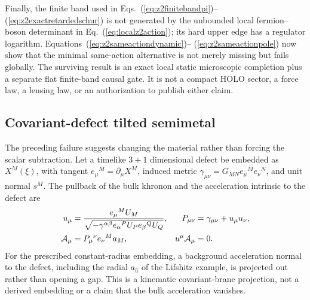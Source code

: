 \documentclass[10pt]{article}
\begin{document}
Finally, the finite band used in Eqs.~(\ref{eq:z2finitebandpi})--
(\ref{eq:z2exactretardedschur}) is not generated by the unbounded local
fermion--boson determinant in Eq.~(\ref{eq:localz2action}); its hard upper edge
has a regulator logarithm.  Equations~(\ref{eq:z2sameactiondynamic})--
(\ref{eq:z2sameactionpole}) now show that the minimal same-action alternative
is not merely missing but fails globally.  The surviving result is an exact
local static microscopic completion plus a separate flat finite-band causal
gate.  It is not a compact HOLO sector, a force law, a lensing law, or an
authorization to publish either claim.

\subsection{Covariant-defect tilted semimetal}
\label{sec:branetiltedsemimetal}

The preceding failure suggests changing the material rather than forcing the
scalar subtraction.  Let a timelike $3+1$ dimensional defect be embedded as
$X^M(\xi)$, with tangent $e_\mu{}^M=\partial_\mu X^M$, induced metric
$\gamma_{\mu\nu}=G_{MN}e_\mu{}^Me_\nu{}^N$, and unit normal $s^M$.  The pullback
of the bulk khronon and the acceleration intrinsic to the defect are
\begin{equation}
 \begin{aligned}
 u_\mu&=\frac{e_\mu{}^MU_M}
 {\sqrt{-\gamma^{\alpha\beta}e_\alpha{}^PU_Pe_\beta{}^QU_Q}},
 &P_{\mu\nu}&=\gamma_{\mu\nu}+u_\mu u_\nu,\\
 {\cal A}_\mu&=P_\mu{}^\nu e_\nu{}^Ma_M,
 &u^\mu{\cal A}_\mu&=0 .
 \end{aligned}
 \label{eq:defectacceleration}
\end{equation}
For the prescribed constant-radius embedding, a background acceleration normal
to the defect, including the radial $a_{\hat u}$ of the Lifshitz example, is
projected out rather than opening a gap.  This is a kinematic covariant-brane
projection, not a derived embedding or a claim that the bulk acceleration
vanishes.
\end{document}

